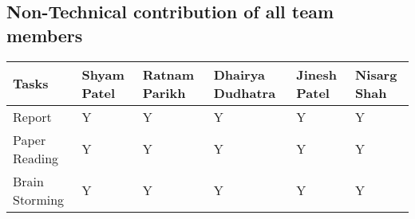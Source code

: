 \documentclass{article}
\begin{document}
\subsection{Non-Technical contribution of all team members }

\begin{table}[h]
\centering
\begin{tabular}{|l|l|l|l|l|l|}
\hline
\textbf{Tasks} & \textbf{Shyam Patel} & \textbf{Ratnam Parikh} & \textbf{Dhairya Dudhatra} & \textbf{Jinesh Patel} & \textbf{Nisarg Shah} \\ \hline

Report          &         Y               &             Y           &   Y       &  Y                      &                 Y                     \\ \hline
Paper Reading         &    Y                    &                   Y     & Y         & Y                       &           Y                           \\ \hline
Brain Storming         & Y                       &                      Y  &    Y      &    Y                    &          Y                            \\ \hline
\end{tabular}
\end{table}

%
\newline
\end{document}
